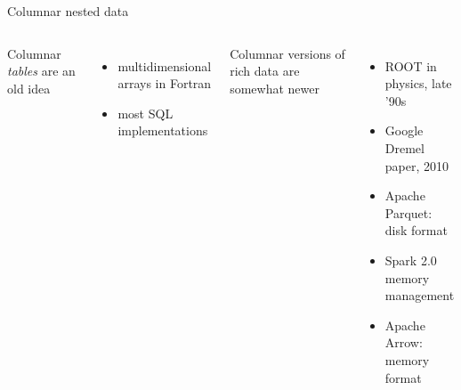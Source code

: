 \documentclass{beamer}
\begin{document}
\begin{frame}{Columnar nested data}
\vspace{0.5 cm}

\begin{columns}
Columnar {\it tables} are an old idea
\begin{itemize}
\item multidimensional arrays in Fortran
\item most SQL implementations
\end{itemize}

\vspace{0.5 cm}
Columnar versions of rich data are somewhat newer
\begin{itemize}
\item ROOT in physics, late '90s
\item Google Dremel paper, 2010
\item Apache Parquet: disk format
\item Spark 2.0 memory management
\item Apache Arrow: memory format
\end{itemize}


\end{columns}
\end{frame}
\end{document}
